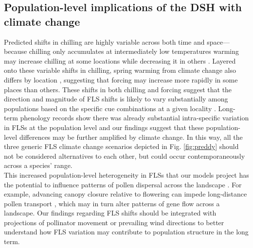 \documentclass[11pt]{article}\usepackage[]{graphicx}\usepackage[]{color}
\begin{document}
\subsection*{Population-level implications of the DSH with climate change} 
\noindent Predicted shifts in chilling are highly variable across both time and space---because chilling only accumulates at intermediately low temperatures warming may increase chilling at some locations while decreasing it in others \citep{Man2017,Zhang:2007aa}. Layered onto these variable shifts in chilling, spring warming from climate change also differs by location \citep{Karmalkar:2017aa,Loarie:2009aa}, suggesting that forcing may increase more rapidly in some places than others. These shifts in both chilling and forcing suggest that the direction and magnitude of FLS shifts is likely to vary substantially among populations based on the specific cue combinations at a given locality \citep{Chmielewski:2012aa}. Long-term phenology records show there was already substantial intra-specific variation in FLSs at the population level \citep{Buonaiuto2020} and our findings suggest that these population-level differences may be further amplified by climate change. In this way, all the three generic FLS climate change scenarios depicted in Fig. \ref{fig:preddy} should not be considered alternatives to each other, but could occur contemporaneously across a species' range. \\ 

\noindent This increased population-level heterogeneity in FLSs that our models project has the potential to influence patterns of pollen dispersal across the landscape \citep{Borycka2017,Pace:2018aa}. For example, advancing canopy closure relative to flowering can impede long-distance pollen transport \citep{Milleron2012}, which may in turn alter patterns of gene flow across a landscape. Our findings regarding FLS shifts should be integrated with projections of pollinator movement or prevailing wind directions \citep{Kling:2020aa} to better understand how FLS variation may contribute to population structure in the long term. \\
\end{document}
